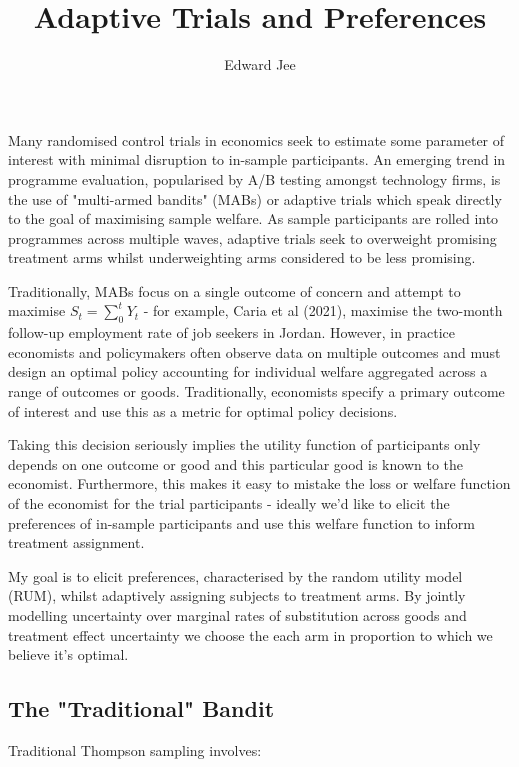 \documentclass{article}
\title{Adaptive Trials and Preferences}
\author{Edward Jee}
\begin{document}


Many randomised control trials in economics seek to estimate some parameter of 
interest with minimal disruption to in-sample participants.  An emerging trend in programme 
evaluation, popularised by A/B testing amongst technology firms, is the use of 
"multi-armed bandits" (MABs) or adaptive trials which speak directly to the goal 
of maximising sample welfare. As sample participants are rolled into programmes 
across multiple waves, adaptive trials seek to overweight promising treatment 
arms whilst underweighting arms considered to be less promising.



Traditionally, MABs focus on a single outcome of concern and attempt to maximise 
$S_t = \sum^t_{0}Y_t$ - for example, Caria et al (2021), maximise the 
two-month follow-up employment rate of job seekers in Jordan. However, in 
practice economists and policymakers often observe data on multiple outcomes and 
must design an optimal policy accounting for individual welfare aggregated across 
a range of outcomes or goods. Traditionally, economists specify a primary outcome 
of interest and use this as a metric for optimal policy decisions. 

    
Taking this decision seriously 
implies the utility function of participants only depends on one outcome or good 
and this particular good is known to the economist. Furthermore, this makes it 
easy to mistake the loss or welfare function of the economist for the trial 
participants - ideally we'd like to elicit the preferences of in-sample participants 
and use this welfare function to inform treatment assignment. 


My goal is  to elicit preferences, characterised by the 
random utility model (RUM), whilst adaptively assigning subjects 
to treatment arms. By jointly modelling uncertainty over marginal rates of substitution 
across goods and treatment effect uncertainty we choose the each arm in proportion 
to which we believe it's optimal.

\subsection*{The "Traditional" Bandit}


Traditional Thompson sampling involves:
\end{document}
